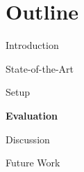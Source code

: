 \section{Outline}
\begin{frame}{}
    \vspace{1.5cm}
    \begin{itemize}
        \setlength\itemsep{2em}
        
        {\color{TUMBlack}
            \item \large Introduction
            \item \large State-of-the-Art
            \item \large Setup
        }
        \item \large \textbf{Evaluation}
        \item \large Discussion
        \item \large Future Work
    \end{itemize}
\end{frame}